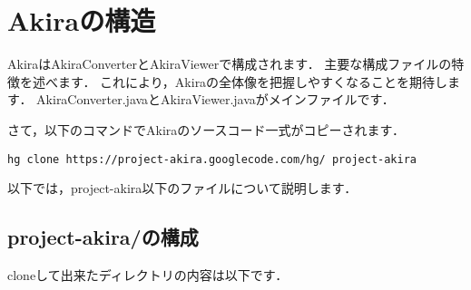 \documentclass[a4j,openany]{jbook}
\begin{document}
\chapter{Akiraの構造}
AkiraはAkiraConverterとAkiraViewerで構成されます．
主要な構成ファイルの特徴を述べます．
これにより，Akiraの全体像を把握しやすくなることを期待します．
AkiraConverter.javaとAkiraViewer.javaがメインファイルです．

さて，以下のコマンドでAkiraのソースコード一式がコピーされます．
\begin{screen}
\begin{verbatim}
hg clone https://project-akira.googlecode.com/hg/ project-akira
\end{verbatim}
\end{screen}
以下では，project-akira以下のファイルについて説明します．

 \section{project-akira/の構成}
 cloneして出来たディレクトリの内容は以下です．
\end{document}

